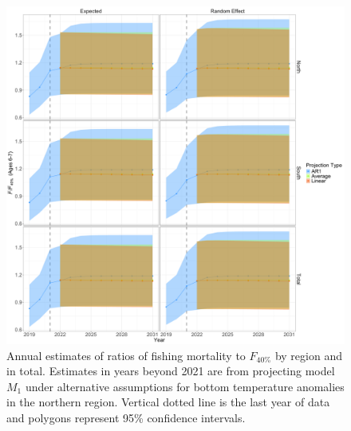 \documentclass[
]{article}
\begin{document}
\begin{figure}

{\centering \includegraphics[height=0.95\textheight]{proj_F_status_results} 

}

\caption{Annual estimates of ratios of fishing mortality to $F_{40\%}$ by region and in total. Estimates in years beyond 2021 are from projecting model $M_1$ under alternative assumptions for bottom temperature anomalies in the northern region. Vertical dotted line is the last year of data and polygons represent 95\% confidence intervals.}\label{fig:F-status-proj}
\end{figure}
\end{document}
